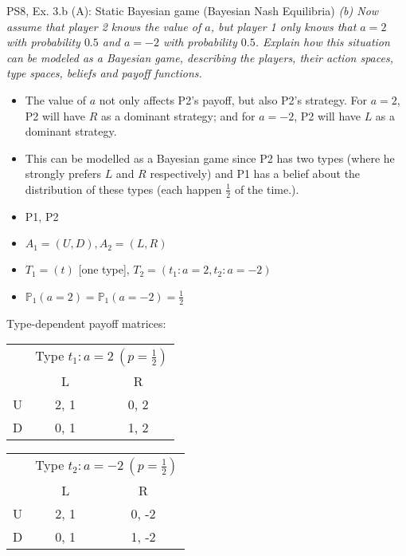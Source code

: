 \begin{frame}{PS8, Ex. 3.b (A): Static Bayesian game (Bayesian Nash Equilibria)}
    \textit{(b) Now assume that player 2 knows the value of $a$, but player 1 only knows that $a=2$ with probability $0.5$ and $a=-2$ with probability $0.5$. Explain how this situation can be modeled as a Bayesian game, describing the players, their action spaces, type spaces, beliefs and payoff functions.}
    \vspace{-8pt}
    \begin{multicols}{2}
      \begin{itemize}
      \item[(a)] The value of $a$ not only affects P2's payoff, but also P2's strategy. For $a=2$, P2 will have $R$ as a dominant strategy; and for $a=-2$, P2 will have $L$ as a dominant strategy.
      \item[(b)] This can be modelled as a Bayesian game since P2 has two types (where he strongly prefers $L$ and $R$ respectively) and P1 has a belief about the distribution of these types (each happen $\frac{1}{2}$ of the time.).
          \item[Players:] P1, P2
          \item[Action sp.:] $A_1=(U,D),A_2=(L,R)$
          \item[Type space:] $T_1=(t)$ [one type], $T_2=(t_1:a=2,t_2:a=-2)$
          \item[Beliefs:] $\mathbb{P}_1(a=2)=\mathbb{P}_1(a=-2)=\frac{1}{2}$
      \end{itemize}
      \vfill\null\columnbreak
      Type-dependent payoff matrices:
      \vspace{-8pt}
      \begin{table}
          \begin{tabular}{l|c|c|}
          \multicolumn{1}{c}{} & \multicolumn{2}{c}{Type $t_1:a=2\ (p=\frac{1}{2})$} \\
          \multicolumn{1}{c}{} & \multicolumn{1}{c}{L} & \multicolumn{1}{c}{R} \\\cline{2-3}
          U & 2, 1 & 0, 2 \\\cline{2-3}
          D & 0, 1 & 1, 2 \\\cline{2-3}
        \end{tabular}
      \end{table}
      \vspace{-8pt}
      \begin{table}
        \begin{tabular}{l|c|c|}
          \multicolumn{1}{c}{} & \multicolumn{2}{c}{Type $t_2:a=-2\ (p=\frac{1}{2})$} \\
          \multicolumn{1}{c}{} & \multicolumn{1}{c}{L} & \multicolumn{1}{c}{R} \\\cline{2-3}
          U & 2, 1 & 0, -2 \\\cline{2-3}
          D & 0, 1 & 1, -2 \\\cline{2-3}
        \end{tabular}
      \end{table}
      \vfill\null
    \end{multicols}
\end{frame}


